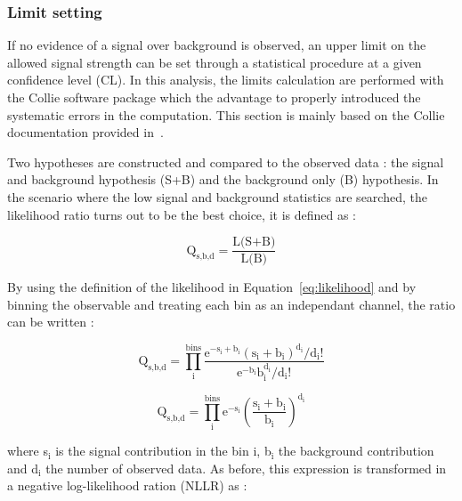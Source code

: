 \documentclass[main.tex]{subfiles}
\begin{document}
\subsubsection{Limit setting}


\NI If no evidence of a signal over background is observed, an upper limit on the allowed signal strength can be set through a statistical procedure at a given confidence level (CL). In this analysis, the limits calculation are performed with the Collie software package which the advantage to properly introduced the systematic errors in the computation. This section is mainly based on the Collie documentation provided in~\cite{NLLR}.


\bigskip


\NI Two hypotheses are constructed and compared to the observed data : the signal and background hypothesis (S+B) and the background only (B) hypothesis. In the scenario where the low signal and background statistics are searched, the likelihood ratio turns out to be the best choice, it is defined as : 


\begin{equation}
\text{Q}_{\text{s,b,d}} = \frac{\text{L(S+B)}}{\text{L(B)}}
\end{equation}


\NI By using the definition of the likelihood in Equation~\ref{eq:likelihood} and by binning the observable and treating each bin as an independant channel, the ratio can be written : 


\bigskip


\begin{equation}
\text{Q}_{\text{s,b,d}} = \prod^{\text{bins}}_\text{i} \frac{\text{e}^{-\text{s}_\text{i} + \text{b}_\text{i}} (\text{s}_\text{i} + \text{b}_\text{i})^{\text{d}_\text{i}} / \text{d}_\text{i} \text{!} }{\text{e}^{-\text{b}_\text{i}} \text{b}_\text{i}^{\text{d}_\text{i}} / \text{d}_\text{i} \text{!}} 
\end{equation}


\begin{equation}
\text{Q}_{\text{s,b,d}} = \prod^{\text{bins}}_\text{i}  \text{e}^{-\text{s}_\text{i}} \left( \frac{\text{s}_\text{i} + \text{b}_\text{i}}{\text{b}_\text{i}} \right)^{\text{d}_\text{i}}
\end{equation}

\bigskip


\NI where s$_\text{i}$ is the signal contribution in the bin i, b$_\text{i}$ the background contribution and d$_\text{i}$ the number of observed data. As before, this expression is transformed in a negative log-likelihood ration (NLLR) as :
\end{document}
